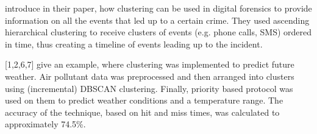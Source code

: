 \documentclass[12pt,a4paper]{article}
\begin{document}


\textcite{forensics} introduce in their paper, how clustering can be used in digital forensics to provide information on all the events that led up to a certain crime. They used ascending hierarchical clustering to receive clusters of events (e.g. phone calls, SMS) ordered in time, thus creating a timeline of events leading up to the incident.

\textcite{convexhullDbscan}[1,2,6,7] give an example, where clustering was implemented to predict future weather. Air pollutant data was preprocessed and then arranged into clusters using (incremental) DBSCAN clustering. Finally, priority based protocol was used on them to predict weather conditions and a temperature range. The accuracy of the technique, based on hit and miss times, was calculated to approximately 74.5\%.
\end{document}
